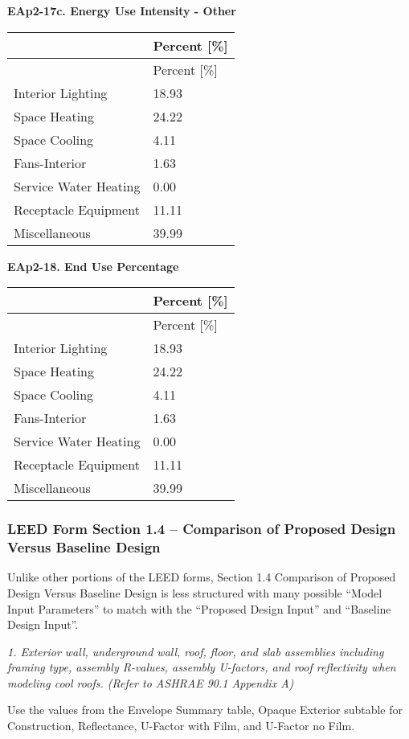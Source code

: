 \textbf{EAp2-17c. Energy Use Intensity - Other}

\begin{longtable}[c]{@{}ll@{}}
\toprule 
 & Percent [\%] \tabularnewline
\midrule
\endfirsthead

\toprule 
 & Percent [\%] \tabularnewline
\midrule
\endhead

Interior Lighting & 18.93 \tabularnewline
Space Heating & 24.22 \tabularnewline
Space Cooling & 4.11 \tabularnewline
Fans-Interior & 1.63 \tabularnewline
Service Water Heating & 0.00 \tabularnewline
Receptacle Equipment & 11.11 \tabularnewline
Miscellaneous & 39.99 \tabularnewline
\bottomrule
\end{longtable}

\textbf{EAp2-18. End Use Percentage}

\begin{longtable}[c]{@{}ll@{}}
\toprule 
 & Percent [\%] \tabularnewline
\midrule
\endfirsthead

\toprule 
 & Percent [\%] \tabularnewline
\midrule
\endhead

Interior Lighting & 18.93 \tabularnewline
Space Heating & 24.22 \tabularnewline
Space Cooling & 4.11 \tabularnewline
Fans-Interior & 1.63 \tabularnewline
Service Water Heating & 0.00 \tabularnewline
Receptacle Equipment & 11.11 \tabularnewline
Miscellaneous & 39.99 \tabularnewline
\bottomrule
\end{longtable}

\subsubsection{LEED Form Section 1.4 -- Comparison of Proposed Design Versus Baseline Design}\label{leed-form-section-1.4-comparison-of-proposed-design-versus-baseline-design}

Unlike other portions of the LEED forms, Section 1.4 Comparison of Proposed Design Versus Baseline Design is less structured with many possible ``Model Input Parameters'' to match with the ``Proposed Design Input'' and ``Baseline Design Input''.

\emph{1. Exterior wall, underground wall, roof, floor, and slab assemblies including framing type, assembly R-values, assembly U-factors, and roof reflectivity when modeling cool roofs. (Refer to ASHRAE 90.1 Appendix A)}

Use the values from the Envelope Summary table, Opaque Exterior subtable for Construction, Reflectance, U-Factor with Film, and U-Factor no Film.

